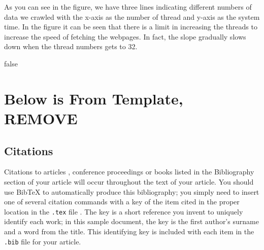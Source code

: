 \documentclass{sig-alternate-05-2015}
\begin{document}

As you can see in the figure, we have three lines indicating different numbers of data we crawled with the x-axis as the number of thread and y-axis as the system time. In the figure it can be seen that there is a limit in increasing the threads to increase the speed of fetching the webpages. In fact, the slope gradually slows down when the thread numbers gets to 32.




%
%
\if false

\section{Below is From Template, REMOVE}
\subsection{Citations}
Citations to articles \cite{bowman:reasoning,
clark:pct, braams:babel, herlihy:methodology},
conference proceedings \cite{clark:pct} or
books \cite{salas:calculus, Lamport:LaTeX} listed
in the Bibliography section of your
article will occur throughout the text of your article.
You should use BibTeX to automatically produce this bibliography;
you simply need to insert one of several citation commands with
a key of the item cited in the proper location in
the \texttt{.tex} file \cite{Lamport:LaTeX}.
The key is a short reference you invent to uniquely
identify each work; in this sample document, the key is
the first author's surname and a
word from the title.  This identifying key is included
with each item in the \texttt{.bib} file for your article.
\end{document}
